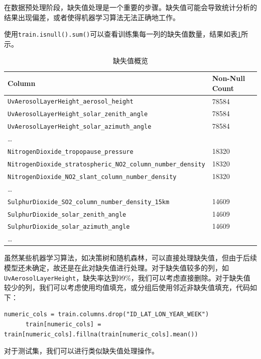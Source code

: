 \documentclass{ctexart}
\begin{document}
在数据预处理阶段，缺失值处理是一个重要的步骤。缺失值可能会导致统计分析的结果出现偏差，或者使得机器学习算法无法正确地工作。

使用\verb|train.isnull().sum()|可以查看训练集每一列的缺失值数量，结果如表\ref{tab:1}所示。

\begin{table}[h]
      \centering
      \begin{tabular}{l|l}
      \hline
      Column & Non-Null Count \\ \hline
      \texttt{UvAerosolLayerHeight\_aerosol\_height} & 78584 \\
      \texttt{UvAerosolLayerHeight\_solar\_zenith\_angle} & 78584 \\
      \texttt{UvAerosolLayerHeight\_solar\_azimuth\_angle} & 78584 \\
      \ldots{} & \\
      \texttt{NitrogenDioxide\_tropopause\_pressure} & 18320 \\
      \texttt{NitrogenDioxide\_stratospheric\_NO2\_column\_number\_density} & 18320 \\
      \texttt{NitrogenDioxide\_NO2\_slant\_column\_number\_density} & 18320 \\
      \ldots{} & \\
      \texttt{SulphurDioxide\_SO2\_column\_number\_density\_15km} & 14609 \\
      \texttt{SulphurDioxide\_solar\_zenith\_angle} & 14609 \\
      \texttt{SulphurDioxide\_solar\_azimuth\_angle} & 14609 \\
      \ldots{} & \\
      \hline
      \end{tabular}
      \caption{\label{tab:1}缺失值概览}
\end{table}

虽然某些机器学习算法，如决策树和随机森林，可以直接处理缺失值，但由于后续模型还未确定，故还是在此对缺失值进行处理。对于缺失值较多的列，如\texttt{UvAerosolLayerHeight}，缺失率达到99\%，我们可以考虑直接删除。对于缺失值较少的列，我们可以考虑使用均值填充，或分组后使用邻近非缺失值填充，代码如下：

\begin{lstlisting}[style=Python]
      numeric_cols = train.columns.drop("ID_LAT_LON_YEAR_WEEK")
      train[numeric_cols] = train[numeric_cols].fillna(train[numeric_cols].mean())
\end{lstlisting}

对于测试集，我们可以进行类似缺失值处理操作。
\end{document}
